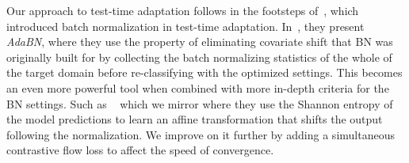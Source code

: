 Our approach to test-time adaptation follows in the footsteps of~\cite{Li2018-el}, which introduced batch normalization in test-time adaptation. In~\cite{Li2018-el}, they present \textit{AdaBN}, where they use the property of eliminating covariate shift that BN was originally built for by collecting the batch normalizing statistics of the whole of the target domain before re-classifying with the optimized settings.  This becomes an even more powerful tool when combined with more in-depth criteria for the BN settings.  Such as ~\cite{wang2020tent} which we mirror where they use the Shannon entropy of the model predictions to learn an affine transformation that shifts the output following the normalization.  We improve on it further by adding a simultaneous contrastive flow loss to affect the speed of convergence.\\




